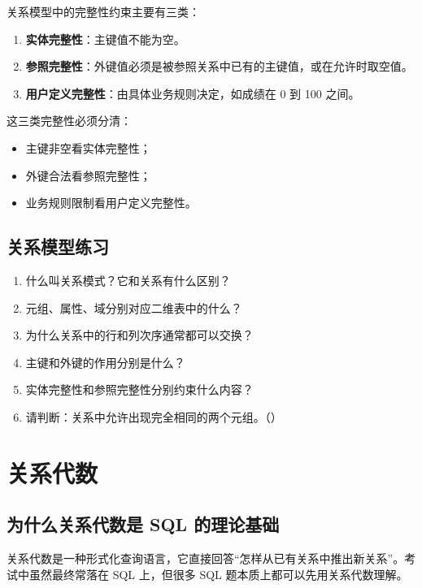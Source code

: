\documentclass{../../note}
\begin{document}
关系模型中的完整性约束主要有三类：

\begin{enumerate}
  \item \textbf{实体完整性}：主键值不能为空。
  \item \textbf{参照完整性}：外键值必须是被参照关系中已有的主键值，或在允许时取空值。
  \item \textbf{用户定义完整性}：由具体业务规则决定，如成绩在 0 到 100 之间。
\end{enumerate}

这三类完整性必须分清：

\begin{itemize}
  \item 主键非空看实体完整性；
  \item 外键合法看参照完整性；
  \item 业务规则限制看用户定义完整性。
\end{itemize}

\subsection{关系模型练习}

\begin{enumerate}
  \item 什么叫关系模式？它和关系有什么区别？
  \item 元组、属性、域分别对应二维表中的什么？
  \item 为什么关系中的行和列次序通常都可以交换？
  \item 主键和外键的作用分别是什么？
  \item 实体完整性和参照完整性分别约束什么内容？
  \item 请判断：关系中允许出现完全相同的两个元组。（\hspace{1cm}）
\end{enumerate}

\section{关系代数}

\subsection{为什么关系代数是 SQL 的理论基础}

关系代数是一种形式化查询语言，它直接回答“怎样从已有关系中推出新关系”。考试中虽然最终常落在 SQL 上，但很多 SQL 题本质上都可以先用关系代数理解。
\end{document}
